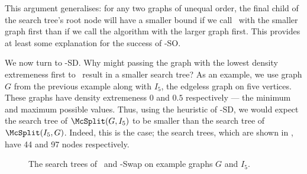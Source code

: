 This argument generalises: for any two graphs of unequal order,
the final child of the search tree's root node will have a smaller bound
if we call \McSplit\ with the smaller graph first than if we call the algorithm
with the larger graph first.  This provides at least some explanation for the success of
\McSplit-SO.

We now turn to \McSplit-SD.  Why might passing the graph with the lowest density
extremeness first to \McSplit\ result in a smaller search tree?  As an example, we
use graph $G$ from the previous example along with $I_5$, the edgeless graph on five vertices.
These graphs have density extremeness $0$ and $0.5$ respectively --- the
minimum and maximum possible values.  Thus, using the heuristic of \McSplit-SD,
we would expect the search tree of $\McSplit(G, I_5)$ to be smaller than the search
tree of $\McSplit(I_5, G)$.  Indeed, this is the case; the search trees,
which are shown in , have 44
and 97 nodes respectively.

\begin{figure}[htb]
    \centering
    \caption{The search trees of \McSplit\ and \McSplit-Swap on example graphs $G$ and $I_5$.}
        \label{figure:search-trees-gi-with-swapping}
\end{figure}

